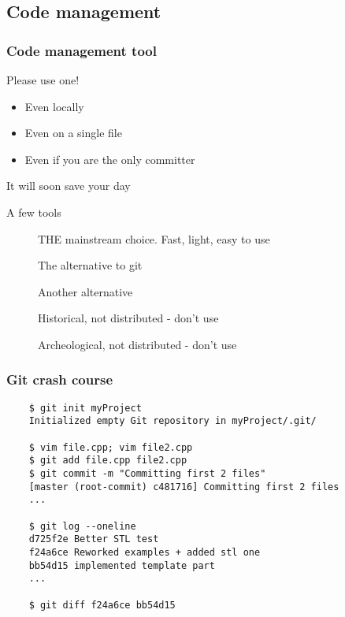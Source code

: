 \subsection[VCS]{Code management}

\begin{frame}[fragile]
  \frametitle{Code management tool}
  \begin{alertblock}{Please use one!}
    \begin{itemize}
    \item Even locally
    \item Even on a single file
    \item Even if you are the only committer
    \end{itemize}
    It will soon save your day
  \end{alertblock}
  \begin{block}{A few tools}
    \begin{description}
    \item[\href{http://git-scm.com/}{}]
      THE mainstream choice. Fast, light, easy to use
    \item[\href{http://mercurial.selenic.com/}{}]
      The alternative to git
    \item[\href{http://bazaar.canonical.com/en/}{}]
      Another alternative
    \item[\href{https://subversion.apache.org/}{}]
      Historical, not distributed - don't use
    \item[\href{https://cvs.nongnu.org/}{}]
      Archeological, not distributed - don't use
    \end{description}
  \end{block}
\end{frame}

\begin{frame}[fragile]
  \frametitle{Git crash course}
  \begin{verbatim}
    $ git init myProject
    Initialized empty Git repository in myProject/.git/

    $ vim file.cpp; vim file2.cpp
    $ git add file.cpp file2.cpp
    $ git commit -m "Committing first 2 files"
    [master (root-commit) c481716] Committing first 2 files
    ...

    $ git log --oneline
    d725f2e Better STL test
    f24a6ce Reworked examples + added stl one
    bb54d15 implemented template part
    ...

    $ git diff f24a6ce bb54d15
  \end{verbatim}
\end{frame}
